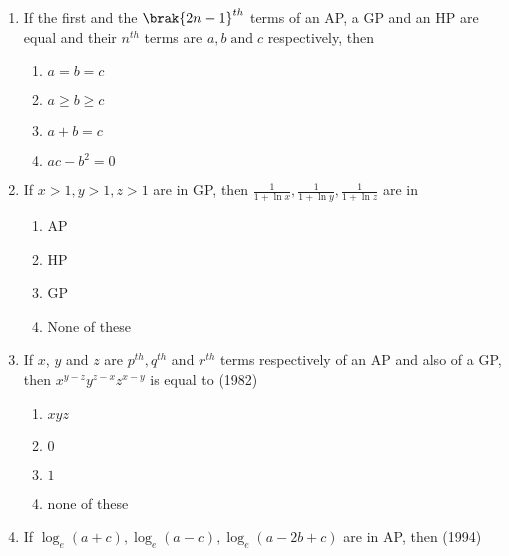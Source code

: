 \begin{enumerate}[label=\thesubsection.\arabic*,ref=\thesubsection.\theenumi]
{\begin{multicols}{4}
\begin{enumerate}    
  \item {-2} \item{4}
  \item{-3}
  \item{2}
  \end{enumerate}
\end{multicols}}
	\item If the first and the $\brak{2n-1}^{th}$ terms of an AP,  a GP and an HP are equal and their $n^{th}$ terms are $a,  b \;  \text{and} \;  c$ respectively,  then \hfill{}
%
\begin{multicols}{4}
\begin{enumerate}    
\item $a=b=c$
\item $a \geq b \geq c$
\item $a+b=c$
\item $ac-b^2=0$
\end{enumerate}
\end{multicols}
%
\item If $x>1, y>1, z>1$ are in GP, then $\frac{1}{1+\ln x}, \frac{1}{1+\ln y}, \frac{1}{1+\ln z}$ are in 
\hfill{}
\begin{multicols}{4}
\begin{enumerate}    
\item AP
\item HP
\item GP
\item None of these
\end{enumerate}
\end{multicols}
%
\item  If $x$, $y$ and $z$ are $p^{th}, q^{th}$ and $r^{th}$ terms respectively of an AP and also of a GP,  then ${x^{y-z} y^{z-x} z^{x-y}}$ 
		    is equal to \hfill{(1982)}
\begin{multicols}{4}
\begin{enumerate}     
  \item $xyz$ 
  \item $0$
  \item $1$ 
  \item none of these
  \end{enumerate}
\end{multicols}
%
\item If $\log_e(a+c), \log_e(a-c), \log_e(a-2b+c)$ are in AP, then \hfill (1994)
    \begin{multicols}{2}

\end{multicols}
\end{enumerate}
